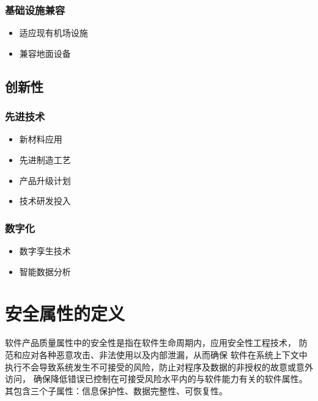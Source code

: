 \begin{multicols}{2}
  \subsubsection{基础设施兼容}
  
  \begin{itemize}
      \item 适应现有机场设施
      \item 兼容地面设备
  \end{itemize}
  
  \subsection{创新性}
  
  \subsubsection{先进技术}
  
  \begin{itemize}
      \item 新材料应用
      \item 先进制造工艺
      \item 产品升级计划
      \item 技术研发投入
  \end{itemize}
  
  \subsubsection{数字化}
  
  \begin{itemize}
      \item 数字孪生技术
      \item 智能数据分析
  \end{itemize}
  
\end{multicols}

\section{安全属性的定义}

软件产品质量属性中的安全性是指在软件生命周期内\cite{space1977national}，应用安全性工程技术，
防范和应对各种恶意攻击、非法使用以及内部泄漏，从而确保
软件在系统上下文中执行不会导致系统发生不可接受的风险\cite{leveson1986software}，防止对程序及数据的非授权的故意或意外访问，
确保降低错误已控制在可接受风险水平内的与软件能力有关的软件属性。其包含三个子属性：信息保护性、数据完整性、可恢复性。\cite{沈国华2016软件可信评估研究综述, 王怀民2014基于网络的可信软件大规模协同开发与演化, 刘彦钊2012一种基于属性划分的软件可信性度量模型研究}


